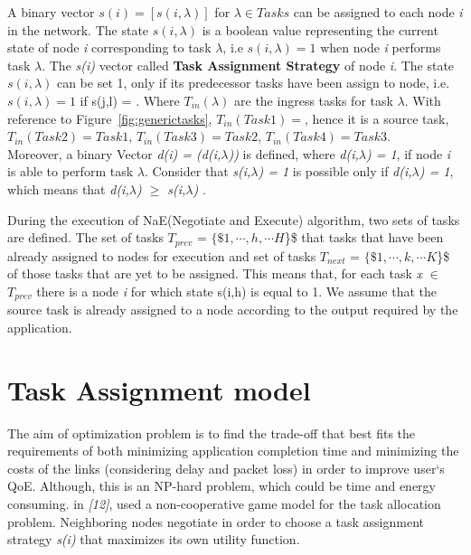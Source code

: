 \documentclass[a4paper]{article}
\begin{document}
A binary vector $s(i) = [s(i, \lambda)]$ for $\lambda \in Tasks$ can be assigned to each node \textit{i} in the network. The state $s(i, \lambda)$ is a boolean value representing the current state of node \textit{i} corresponding to task $\lambda$, i.e $s(i,\lambda) = 1$ when node \textit{i} performs task $\lambda$. The \textit{s(i)} vector called \textbf{Task Assignment Strategy} of node \textit{i}. The state $s(i,\lambda)$ can be set 1, only if its predecessor tasks have been assign to node, i.e.  $s(i,\lambda) = 1$ if s(j,l) = . Where $T_{in}(\lambda)$ are the ingress tasks for task $\lambda$. With reference to Figure~\ref{fig:generictasks},  $T_{in}(Task1) = {}$, hence it is a source task, $T_{in}(Task2) = {Task1}$, $T_{in}(Task3) = {Task2}$, $T_{in}(Task4) = {Task3}$.    \\

Moreover, a binary Vector \textit{ d(i) = (d(i,$\lambda$))} is defined, where \textit{d(i,$\lambda$) = 1}, if node \textit{i} is able to perform task \textit{$\lambda$}. Consider that \textit{s(i,$\lambda$) = 1} is possible only if \textit{d(i,$\lambda$) = 1}, which means that \textit{d(i,$\lambda$) $\geq$  s(i,$\lambda$)} .

During the execution of NaE(Negotiate and Execute) algorithm, two sets of tasks are defined. The set of tasks $T_{prev}$ = $\{\$ 1,\cdots,h,\cdots H $\}\$
that tasks that have been already assigned to nodes for execution and set of tasks $T_{next}$ = $\{\$ 1,\cdots,k,\cdots K $\}\$ of those tasks that are yet to be assigned. This means that, for each task \textit{x} $\in$ $T_{prev}$ there is a node \textit{i} for which state s(i,h) is equal to 1. We assume that the source task is already assigned to a node according to the output required by the application. \\


\section{Task Assignment model}

The aim of optimization problem is to find the trade-off that best fits the requirements of both %
minimizing application completion time and minimizing the costs of the links (considering delay and packet loss) in order to improve user`s QoE. Although, this is an NP-hard problem, which could be time and energy consuming.  in \textit{[12]}, used a non-cooperative game model for the task allocation problem. Neighboring nodes negotiate in order to choose a task assignment strategy \textit{s(i)} that maximizes its own utility function.
\end{document}
